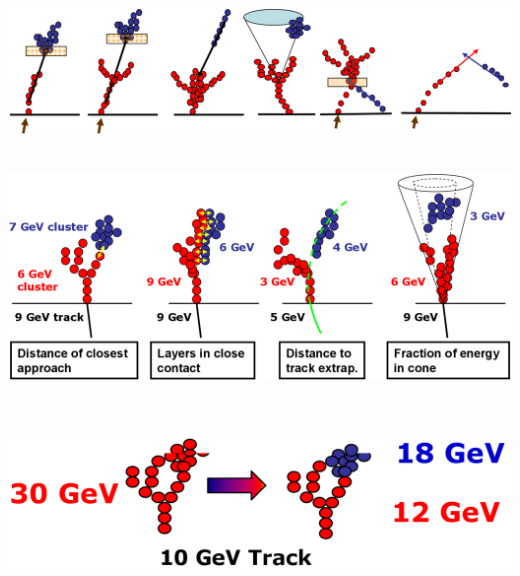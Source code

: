 \documentclass[8pt]{beamer}
\begin{document}
\begin{frame}
\begin{minipage}{0.39\linewidth}
\begin{center}
      \end{center}
    \end{minipage}
    \begin{minipage}{0.6\linewidth}
      \vspace{-10pt}
      \begin{center}
        \includegraphics[width=\linewidth]{PandoraAssociations.pdf}
         \\
        \vspace{0.1cm}
        \includegraphics[width=0.8\linewidth]{PandoraFragmentRemoval.pdf}
        \begin{tikzpicture}
        \end{tikzpicture}
      \end{center}
    \end{minipage} ~ \hfill
    \begin{minipage}{0.37\linewidth}
      \begin{center}
        \includegraphics[width=\linewidth]{PandoraReclustering-ClusterSplitting.pdf} \\ ~ \\

\end{center}
\end{minipage}
\end{frame}
\end{document}
